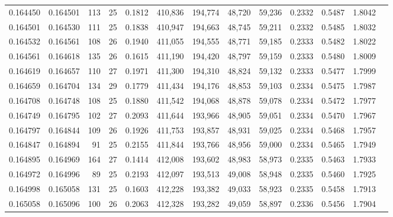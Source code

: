 \begin{tabular}{rrrrrrrrrrrrr}
0.164450 & 0.164501 & 113 &  25 &                                     0.1812 & 410,836 & 194,774 &  48,720 &  59,236 & 0.2332 & 0.5487 & 1.8042 \\
0.164501 & 0.164530 & 111 &  25 &                                     0.1838 & 410,947 & 194,663 &  48,745 &  59,211 & 0.2332 & 0.5485 & 1.8032 \\
0.164532 & 0.164561 & 108 &  26 &                                     0.1940 & 411,055 & 194,555 &  48,771 &  59,185 & 0.2333 & 0.5482 & 1.8022 \\
0.164561 & 0.164618 & 135 &  26 &                                     0.1615 & 411,190 & 194,420 &  48,797 &  59,159 & 0.2333 & 0.5480 & 1.8009 \\
0.164619 & 0.164657 & 110 &  27 &                                     0.1971 & 411,300 & 194,310 &  48,824 &  59,132 & 0.2333 & 0.5477 & 1.7999 \\
0.164659 & 0.164704 & 134 &  29 &                                     0.1779 & 411,434 & 194,176 &  48,853 &  59,103 & 0.2334 & 0.5475 & 1.7987 \\
0.164708 & 0.164748 & 108 &  25 &                                     0.1880 & 411,542 & 194,068 &  48,878 &  59,078 & 0.2334 & 0.5472 & 1.7977 \\
0.164749 & 0.164795 & 102 &  27 &                                     0.2093 & 411,644 & 193,966 &  48,905 &  59,051 & 0.2334 & 0.5470 & 1.7967 \\
0.164797 & 0.164844 & 109 &  26 &                                     0.1926 & 411,753 & 193,857 &  48,931 &  59,025 & 0.2334 & 0.5468 & 1.7957 \\
0.164847 & 0.164894 &  91 &  25 &                                     0.2155 & 411,844 & 193,766 &  48,956 &  59,000 & 0.2334 & 0.5465 & 1.7949 \\
0.164895 & 0.164969 & 164 &  27 &                                     0.1414 & 412,008 & 193,602 &  48,983 &  58,973 & 0.2335 & 0.5463 & 1.7933 \\
0.164972 & 0.164996 &  89 &  25 &                                     0.2193 & 412,097 & 193,513 &  49,008 &  58,948 & 0.2335 & 0.5460 & 1.7925 \\
0.164998 & 0.165058 & 131 &  25 &                                     0.1603 & 412,228 & 193,382 &  49,033 &  58,923 & 0.2335 & 0.5458 & 1.7913 \\
0.165058 & 0.165096 & 100 &  26 &                                     0.2063 & 412,328 & 193,282 &  49,059 &  58,897 & 0.2336 & 0.5456 & 1.7904 \\

\end{tabular}
